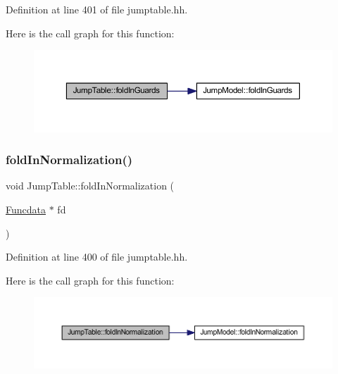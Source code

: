 Definition at line 401 of file jumptable.\+hh.

Here is the call graph for this function\+:
\nopagebreak
\begin{figure}[H]
\begin{center}
\leavevmode
\includegraphics[width=350pt]{class_jump_table_a93527eafa438cf24fb5ee796e7bb1ba6_cgraph}
\end{center}
\end{figure}
\mbox{\label{class_jump_table_adce4756430ff5677d7acbe42ffe28775}} 
\subsubsection{\texorpdfstring{foldInNormalization()}{foldInNormalization()}}
{\footnotesize\ttfamily void Jump\+Table\+::fold\+In\+Normalization (\begin{DoxyParamCaption}\item[{\mbox{\hyperlink{class_funcdata}{Funcdata}} $\ast$}]{fd }\end{DoxyParamCaption})\hspace{0.3cm}{\ttfamily [inline]}}



Definition at line 400 of file jumptable.\+hh.

Here is the call graph for this function\+:
\nopagebreak
\begin{figure}[H]
\begin{center}
\leavevmode
\includegraphics[width=350pt]{class_jump_table_adce4756430ff5677d7acbe42ffe28775_cgraph}
\end{center}
\end{figure}
\mbox{\label{class_jump_table_ab55c26932c2133039fa2cce13ba3742b}} 
